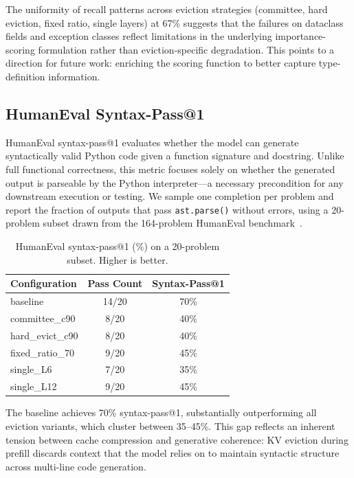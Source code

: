 \documentclass[letterpaper]{article} %
\begin{document}
The uniformity of recall patterns across eviction strategies (committee, hard eviction, fixed ratio, single layers) 
at 67\% suggests that the failures on dataclass fields and exception classes reflect limitations in the underlying 
importance-scoring formulation rather than eviction-specific degradation. This points to a direction for future work: 
enriching the scoring function to better capture type-definition information.



\subsection{HumanEval Syntax-Pass@1}
\label{sec:exp_humaneval}

HumanEval syntax-pass@1 evaluates whether the model can generate syntactically valid Python code
given a function signature and docstring. Unlike full functional correctness, this metric focuses
solely on whether the generated output is parseable by the Python interpreter---a necessary
precondition for any downstream execution or testing. We sample one completion per problem
and report the fraction of outputs that pass \texttt{ast.parse()} without errors, using a
20-problem subset drawn from the 164-problem HumanEval benchmark~\cite{chen2021humaneval}.

\begin{table}[t]
\centering
\small
\caption{HumanEval syntax-pass@1 (\%) on a 20-problem subset. Higher is better.}
\label{tab:humaneval}
\begin{tabular}{lcc}
\toprule
Configuration & Pass Count & Syntax-Pass@1 \\
\midrule
baseline         & 14/20 & 70\% \\
committee\_c90   &  8/20 & 40\% \\
hard\_evict\_c90 &  8/20 & 40\% \\
fixed\_ratio\_70 &  9/20 & 45\% \\
single\_L6       &  7/20 & 35\% \\
single\_L12      &  9/20 & 45\% \\
\bottomrule
\end{tabular}
\end{table}

The baseline achieves 70\% syntax-pass@1, substantially outperforming all eviction
variants, which cluster between 35--45\%. This gap reflects an inherent tension between
cache compression and generative coherence: KV eviction during prefill discards context
that the model relies on to maintain syntactic structure across multi-line code generation.
\end{document}
